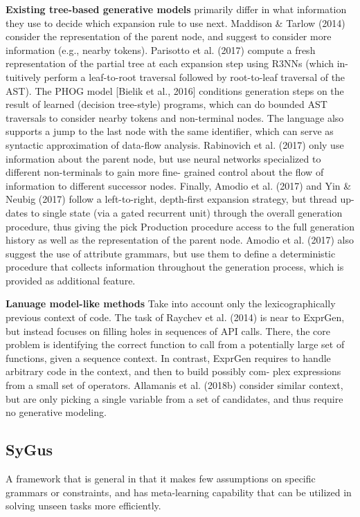 \documentclass{article}
\begin{document}
\textbf{Existing tree-based generative models}
primarily differ in what information they use to decide which expansion rule to use next. Maddison \& Tarlow (2014) consider the representation of the  parent node, and suggest to consider more information (e.g., nearby tokens). Parisotto et al. (2017) compute a fresh representation of the partial tree at each expansion step using R3NNs (which in- tuitively perform a leaf-to-root traversal followed by root-to-leaf traversal of the AST). The PHOG model [Bielik et al., 2016] conditions generation steps on the result of learned (decision tree-style) programs, which can do bounded AST traversals to consider nearby tokens and non-terminal nodes. The language also supports a jump to the last node with the same identifier, which can serve as syntactic approximation of data-flow analysis. Rabinovich et al. (2017) only use information about the parent node, but use neural networks specialized to different non-terminals to gain more fine- grained control about the flow of information to different successor nodes. Finally, Amodio et al. (2017) and Yin \& Neubig (2017) follow a left-to-right, depth-first expansion strategy, but thread up- dates to single state (via a gated recurrent unit) through the overall generation procedure, thus giving the pick Production procedure access to the full generation history as well as the representation of the parent node. Amodio et al. (2017) also suggest the use of attribute grammars, but use them to define a deterministic procedure that collects information throughout the generation process, which is provided as additional feature.

\textbf{Lanuage model-like methods} 
Take into account only the lexicographically previous context of code. The task of Raychev et al. (2014) is near to ExprGen, but instead focuses on filling holes in sequences of API calls. There, the core problem is identifying the correct function to call from a potentially large set of functions, given a sequence context. In contrast, ExprGen requires to handle arbitrary code in the context, and then to build possibly com- plex expressions from a small set of operators. Allamanis et al. (2018b) consider similar context, but are only picking a single variable from a set of candidates, and thus require no generative modeling.
\subsection{SyGus}
 A framework that is general in that it makes few assumptions on specific grammars or constraints, and has meta-learning capability that can be utilized in solving unseen tasks more efficiently.
\end{document}
